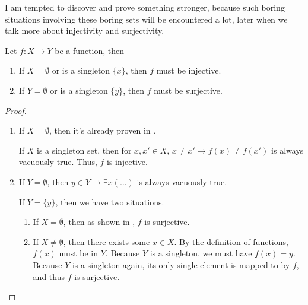 I am tempted to discover and prove something stronger, because such boring situations involving these boring sets will be encountered a lot, later when we talk more about injectivity and surjectivity.
\begin{thm}\label{my.boring.inj.surj.thm}
	Let $f: X \to Y$ be a function, then
	\begin{enumerate}
		\item If $X = \emptyset$ or is a singleton $\{x\}$, then $f$ must be injective.
		\item If $Y = \emptyset$ or is a singleton $\{y\}$, then $f$ must be surjective.
	\end{enumerate}
\end{thm}
\begin{proof}\leavevmode
	\begin{enumerate}
		\item If $X = \emptyset$, then it's already proven in .
		
		If $X$ is a singleton set, then for $x,x' \in X$, $x \ne x' \to f(x) \ne f(x')$ is always vacuously true. Thus, $f$ is injective.
		
		\item If $Y = \emptyset$, then $y \in Y \to \exists x(\dots)$ is always vacuously true.
		
		If $Y = \{y\}$, then we have two situations.
		\begin{enumerate}
			\item If $X = \emptyset$, then as shown in , $f$ is surjective.
			\item If $X \ne \emptyset$, then there exists some $x \in X$. By the definition of functions, $f(x)$ must be in $Y$. Because $Y$ is a singleton, we must have $f(x) = y$. Because $Y$ is a singleton again, its only single element is mapped to by $f$, and thus $f$ is surjective.
		\end{enumerate}
	\end{enumerate}
\end{proof}

